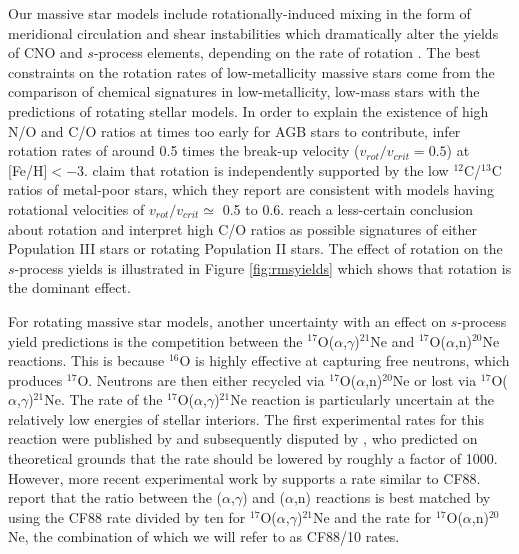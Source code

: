 Our massive star models include rotationally-induced mixing in the form of meridional circulation and shear instabilities which dramatically alter the yields of CNO and $s$-process elements, depending on the rate of rotation \citep{Frischknecht:2012il}. The best constraints on the rotation rates of low-metallicity massive stars come from the comparison of chemical signatures in low-metallicity, low-mass stars with the predictions of rotating stellar models. In order to explain the existence of high N/O and C/O ratios at times too early for AGB stars to contribute, \citet{Chiappini:2006km} infer rotation rates of around 0.5 times the break-up velocity ($v_{rot}/v_{crit} = 0.5$) at [Fe/H]$<-3$. \citet{Chiappini:2008fe} claim that rotation is independently supported by the low $^{12}$C/$^{13}$C ratios of metal-poor stars, which they report are consistent with models having rotational velocities of $v_{rot}/v_{crit} \simeq$ 0.5 to 0.6. \citet{Fabbian:2009jh} reach a less-certain conclusion about rotation and interpret high C/O ratios as possible signatures of either Population III stars or rotating Population II stars. The effect of rotation on the $s$-process yields is illustrated in Figure \ref{fig:rmsyields} which shows that rotation is the dominant effect.

For rotating massive star models, another uncertainty with an effect on $s$-process yield predictions is the competition between the $^{17}$O($\alpha$,$\gamma$)$^{21}$Ne and $^{17}$O($\alpha$,n)$^{20}$Ne reactions. This is because $^{16}$O is highly effective at capturing free neutrons, which produces $^{17}$O. Neutrons are then either recycled via $^{17}$O($\alpha$,n)$^{20}$Ne or lost via $^{17}$O($\alpha$,$\gamma$)$^{21}$Ne. The rate of the $^{17}$O($\alpha$,$\gamma$)$^{21}$Ne reaction is particularly uncertain at the relatively low energies of stellar interiors. The first experimental rates for this reaction were published by \citep[][hereafter CF88]{Caughlan:1988dn} and subsequently disputed by \citet{Descouvemont:1993kc}, who predicted on theoretical grounds that the rate should be lowered by roughly a factor of 1000. However, more recent experimental work by \citet{Best:2011gb} supports a rate similar to CF88. \citet{Best:2013gb} report that the ratio between the ($\alpha$,$\gamma$) and ($\alpha$,n) reactions is best matched by using the CF88 rate divided by ten for $^{17}$O($\alpha$,$\gamma$)$^{21}$Ne and the \citet[][NACRE]{Angulo:1999kp} rate for $^{17}$O($\alpha$,n)$^{20}$Ne, the combination of which we will refer to as CF88/10 rates.

